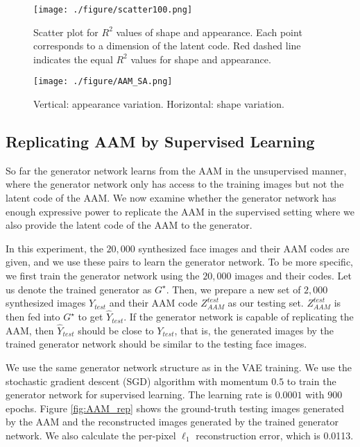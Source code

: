 \documentclass{article}
\begin{document}
\begin{figure}[h]
	\begin{center}
		\texttt{[image: ./figure/scatter100.png]}
		\caption{Scatter plot for $R^2$ values of shape and appearance. Each point corresponds to a dimension of the latent code. Red dashed line indicates the equal $R^2$ values for shape and appearance. }
		\label{fig:scatterSA}
	\end{center}
\end{figure}

\begin{figure}[h]
	\begin{center}
		\texttt{[image: ./figure/AAM\_SA.png]}
		\caption{Vertical: appearance variation. Horizontal: shape variation.}
		\label{fig:AAM_variation}
	\end{center}
\end{figure}

\subsection{Replicating AAM by Supervised Learning}

So far the generator network learns from the AAM in the unsupervised manner, where the generator network only has access to the training images but not the latent code of the AAM.
 We now examine whether the generator network has enough expressive power to replicate the AAM in the supervised setting where we also provide the latent code of the AAM to the generator.

In this experiment, the $20,000$ synthesized face images and their AAM codes are given, and we use these pairs to learn the generator network. To be more specific, we first train the generator network using the $20,000$ images and their codes. Let us denote the trained generator as $G^\star$. Then, we prepare a new set of $2,000$ synthesized images $Y_{test}$ and their AAM code $Z^{test}_{AAM}$ as our testing set. $Z^{test}_{AAM}$ is then fed into $G^\star$ to get $\hat{Y}_{test}$. If the generator network is capable of replicating the AAM, then $\hat{Y}_{test}$ should be close to $Y_{test}$, that is, the generated images by the trained generator network should be similar to the testing face images.

We use the same generator network structure as in the VAE training. We use the stochastic gradient descent (SGD) algorithm with momentum $0.5$ to train the generator network for supervised learning. The learning rate is $0.0001$ with $900$ epochs. Figure \ref{fig:AAM_rep} shows the ground-truth testing images generated by the AAM and the reconstructed images generated by the trained generator network. We also calculate the per-pixel $\ell_1$ reconstruction error, which is 0.0113.
\end{document}
